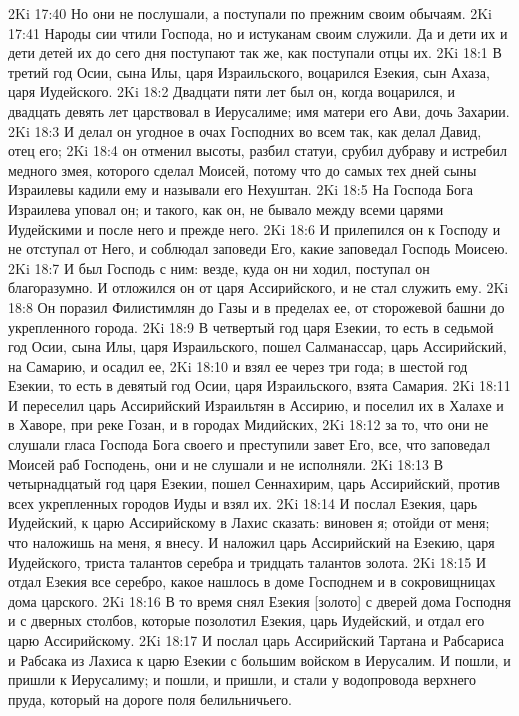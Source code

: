 2Ki 17:40  Но они не послушали, а поступали по прежним своим обычаям.
2Ki 17:41  Народы сии чтили Господа, но и истуканам своим служили. Да и дети их и дети детей их до сего дня поступают так же, как поступали отцы их.
2Ki 18:1  В третий год Осии, сына Илы, царя Израильского, воцарился Езекия, сын Ахаза, царя Иудейского.
2Ki 18:2  Двадцати пяти лет был он, когда воцарился, и двадцать девять лет царствовал в Иерусалиме; имя матери его Ави, дочь Захарии.
2Ki 18:3  И делал он угодное в очах Господних во всем так, как делал Давид, отец его;
2Ki 18:4  он отменил высоты, разбил статуи, срубил дубраву и истребил медного змея, которого сделал Моисей, потому что до самых тех дней сыны Израилевы кадили ему и называли его Нехуштан.
2Ki 18:5  На Господа Бога Израилева уповал он; и такого, как он, не бывало между всеми царями Иудейскими и после него и прежде него.
2Ki 18:6  И прилепился он к Господу и не отступал от Него, и соблюдал заповеди Его, какие заповедал Господь Моисею.
2Ki 18:7  И был Господь с ним: везде, куда он ни ходил, поступал он благоразумно. И отложился он от царя Ассирийского, и не стал служить ему.
2Ki 18:8  Он поразил Филистимлян до Газы и в пределах ее, от сторожевой башни до укрепленного города.
2Ki 18:9  В четвертый год царя Езекии, то есть в седьмой год Осии, сына Илы, царя Израильского, пошел Салманассар, царь Ассирийский, на Самарию, и осадил ее,
2Ki 18:10  и взял ее через три года; в шестой год Езекии, то есть в девятый год Осии, царя Израильского, взята Самария.
2Ki 18:11  И переселил царь Ассирийский Израильтян в Ассирию, и поселил их в Халахе и в Хаворе, при реке Гозан, и в городах Мидийских,
2Ki 18:12  за то, что они не слушали гласа Господа Бога своего и преступили завет Его, все, что заповедал Моисей раб Господень, они и не слушали и не исполняли.
2Ki 18:13  В четырнадцатый год царя Езекии, пошел Сеннахирим, царь Ассирийский, против всех укрепленных городов Иуды и взял их.
2Ki 18:14  И послал Езекия, царь Иудейский, к царю Ассирийскому в Лахис сказать: виновен я; отойди от меня; что наложишь на меня, я внесу. И наложил царь Ассирийский на Езекию, царя Иудейского, триста талантов серебра и тридцать талантов золота.
2Ki 18:15  И отдал Езекия все серебро, какое нашлось в доме Господнем и в сокровищницах дома царского.
2Ki 18:16  В то время снял Езекия [золото] с дверей дома Господня и с дверных столбов, которые позолотил Езекия, царь Иудейский, и отдал его царю Ассирийскому.
2Ki 18:17  И послал царь Ассирийский Тартана и Рабсариса и Рабсака из Лахиса к царю Езекии с большим войском в Иерусалим. И пошли, и пришли к Иерусалиму; и пошли, и пришли, и стали у водопровода верхнего пруда, который на дороге поля белильничьего.
